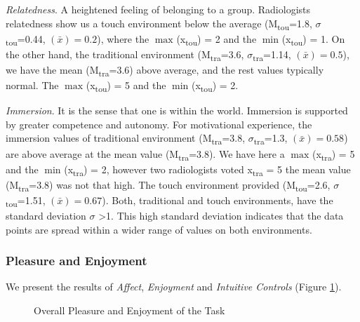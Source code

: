 \documentclass{sigchi}
\begin{document}
\textit{Relatedness}. A heightened feeling of belonging to a group. Radiologists relatedness show us a touch environment below the average (M\textsubscript{tou}=1.8, $\sigma$\textsubscript{tou}=0.44, {}$\left({\bar x}\right)=0.2$), where the $\max_{}$(x\textsubscript{tou}) = 2 and the $\min_{}$(x\textsubscript{tou}) = 1.  On the other hand, the traditional environment (M\textsubscript{tra}=3.6, $\sigma$\textsubscript{tra}=1.14, {}$\left({\bar x}\right)=0.5$), we have the mean (M\textsubscript{tra}=3.6) above average, and the rest values typically normal. The $\max_{}$(x\textsubscript{tou}) = 5 and the $\min_{}$(x\textsubscript{tou}) = 2.

\textit{Immersion}. It is the sense that one is within the world. Immersion is supported by greater competence and autonomy. For motivational experience, the immersion values of traditional environment (M\textsubscript{tra}=3.8, $\sigma$\textsubscript{tra}=1.3, {}$\left({\bar x}\right)=0.58$) are above average at the mean value (M\textsubscript{tra}=3.8). We have here a $\max_{}$(x\textsubscript{tra}) = 5 and the $\min_{}$(x\textsubscript{tra}) = 2, however two radiologists voted x\textsubscript{tra} = 5 the mean value (M\textsubscript{tra}=3.8) was not that high. The touch environment provided (M\textsubscript{tou}=2.6, $\sigma$\textsubscript{tou}=1.51, {}$\left({\bar x}\right)=0.67$). Both, traditional and touch environments, have the standard deviation $\sigma$ \textgreater 1. This high standard deviation indicates that the data points are spread within a wider range of values on both environments.

\subsubsection{Pleasure and Enjoyment}

We present the results of \textit{Affect}, \textit{Enjoyment} and \textit{Intuitive Controls} (Figure \ref{fig:Fig11}).

\begin{figure}
\caption{Overall Pleasure and Enjoyment of the Task}
\label{fig:Fig11}
\end{figure}
\end{document}
